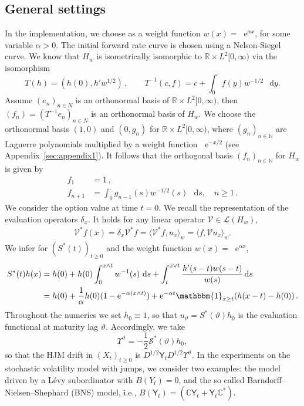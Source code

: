 \documentclass[10pt,a4paper,reqno]{amsart}
\newcommand*\D{\mathop{}\!\mathrm{d}}
\newcommand*\E{\mathop{}\!\mathrm{e}}
\numberwithin{equation}{section}
\theoremstyle{plain}
\theoremstyle{definition}
\theoremstyle{example}
\renewcommand{\MR}{\mathbb{R}}
\newcommand{\R}{\MR}
\newcommand{\cL}{\mathcal{L}}
\newcommand{\cV}{\mathcal{V}}
\newcommand{\sY}{\mathsf{Y}}
\begin{document}
\subsection{General settings}
In the implementation, we choose as a weight function $w(x) = \E^{\alpha x}$, for some variable $\alpha>0$. The initial forward rate curve is chosen using a Nelson-Siegel curve. 
We know that $H_w$ is isometrically isomorphic to $\R \times  L^2[0,\infty)$ via the isomorphism
\begin{equation}\label{eq:isomorphism}
T(h) = (h(0), h' w^{1/2})\,, \qquad T^{-1}(c,f) = c+\int_0^\cdot f(y)w^{-1/2}\, \D y.
\end{equation}
Assume $(e_n)_{n\in N}$ is an orthonormal basis of $\mathbb{R} \times L^2[0, \infty)$, then $(f_n) = (T^{-1}e_n)_{n\in N}$ is an orthonormal basis of $H_w$. We choose the orthonormal basis $(1, 0)$ and $(0, g_n)$ for $\mathbb{R} \times L^2[0, \infty)$, where $(g_n)_{n \in \mathbb{N}}$ are Laguerre polynomials 
multiplied by a weight function $\E^{-x/2}$ (see Appendix~\ref{sec:appendix1}). 
It follows that the orthogonal basis $(f_n)_{n\in \mathbb{N}}$ for $H_w$ is given by 
\begin{equation}\label{eq:f_basis}
\begin{aligned}
f_1 &= 1\,, \\
f_{n+1} &= \int_0^{\cdot}g_{n-1}(s)w^{-1/2}(s)\, \D s,\quad n\geq 1\,. 
\end{aligned}
\end{equation}
We consider the option value at time $t=0$. We recall the representation of the evaluation operators $\delta_x$. It holds for any linear operator $\cV \in \cL(H_w)$,
\begin{align*}
    \cV^*f(x) =\delta_x\cV^*f = \langle \cV^*f, u_x\rangle_w = \langle f, \cV u_x\rangle_w.
\end{align*}
We infer for $(S^*(t))_{t\geq 0}$ and the weight function $w(x) =  \E^{\alpha x}$,
\begin{align}\label{eq:semigroup-excplicit-form}
		S^*(t)h(x) &= h(0) + h(0)\int_0^{x\wedge t}w^{-1}(s)\,\D s + \int_t^{x\vee t} \frac{h^\prime(s-t)w(s-t)}{w(s)} \D s\nonumber\\
        & = h(0) + \frac{1}{\alpha}h(0)(1-\E^{-\alpha(x\wedge t)}) + \E^{-\alpha t}\mathbbm{1}_{x\geq t}(h(x-t)-h(0))\,.
\end{align}
Throughout the numerics we set $h_0\equiv 1$, so that $u_\vartheta=S^*(\vartheta)h_0$ is the evaluation functional at maturity lag $\vartheta$. Accordingly, we take
$$
\Upsilon^\vartheta=-\frac{1}{2}\mathcal{S}^*(\vartheta)h_0,
$$
so that the HJM drift in $(X_t)_{t\geq0}$ is $D^{1/2}\mathsf Y_t D^{1/2}\Upsilon^\vartheta$.
In the experiments on the stochastic volatility model with jumps, we consider two examples: the model driven by a L\'evy subordinator with $B(Y_t)=0$, and the so called Barndorff–Nielsen–Shephard (BNS) model, i.e., $B(\sY_t) = (\mathbb{C} \sY_t + \sY_t \mathbb{C}^*)$.
\end{document}
